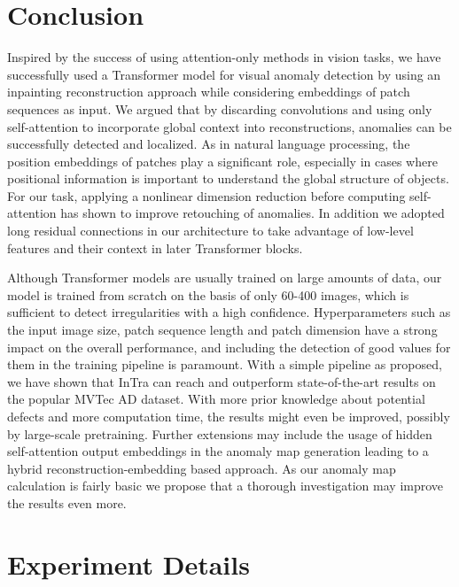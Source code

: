 \documentclass[final,5p,times,twocolumn]{elsarticle}
\begin{document}
	
	\section{Conclusion}
	Inspired by the success of using attention-only methods in vision tasks, we have successfully used a Transformer model for visual anomaly detection by using an inpainting reconstruction approach while considering embeddings of patch sequences as input. We argued that by discarding convolutions and using only self-attention to incorporate global context into reconstructions, anomalies can be successfully detected and localized. 
	As in natural language processing, the position embeddings of patches play a significant role, especially in cases where positional information is important to understand the global structure of objects. For our task, applying a nonlinear dimension reduction before computing self-attention has shown to improve retouching of anomalies. In addition we adopted long residual connections in our architecture to take advantage of low-level features and their context in later Transformer blocks. 
	
	Although Transformer models are usually trained on large amounts of data, our model is trained from scratch on the basis of only 60-400 images, which is sufficient to detect irregularities with a high confidence. 
	Hyperparameters such as the input image size, patch sequence length and patch dimension have a strong impact on the overall performance, and including the detection of good values for them in the training pipeline is paramount. With a simple pipeline as proposed, we have shown that InTra can reach and outperform state-of-the-art results on the popular MVTec AD dataset. With more prior knowledge about potential defects and more computation time, the results might even be improved, possibly by large-scale pretraining.
	Further extensions may include the usage of hidden self-attention output embeddings in the anomaly map generation leading to a hybrid reconstruction-embedding based approach.
	As our anomaly map calculation is fairly basic we propose that a thorough investigation may improve the results even more.
	
	

	
	
	\appendix
	
	\onecolumn
	
	\section{Experiment Details}
	
\end{document}
